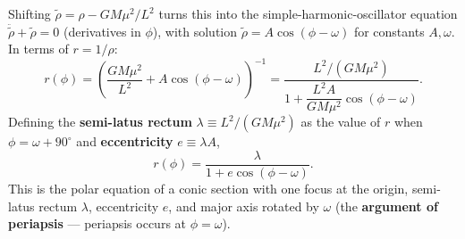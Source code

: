 \documentclass[11pt]{article}
\begin{document}
Shifting $\tilde\rho=\rho-GM\mu^2/L^2$ turns this into the simple-harmonic-oscillator equation $\ddot{\tilde\rho}+\tilde\rho=0$ (derivatives in $\phi$), with solution $\tilde\rho=A\cos(\phi-\omega)$ for constants $A,\omega$. In terms of $r=1/\rho$:
\[
r(\phi)=\left(\frac{GM\mu^2}{L^2}+A\cos(\phi-\omega)\right)^{-1}
=\frac{L^2/(GM\mu^2)}{1+\dfrac{L^2A}{GM\mu^2}\cos(\phi-\omega)}.
\]
Defining the \textbf{semi-latus rectum} $\lambda \equiv L^2/(GM\mu^2)$ as the value of $r$ when $\phi=\omega+90^{\circ}$ and \textbf{eccentricity} $e\equiv \lambda A$,
\begin{equation}
\boxed{r(\phi) = \frac{\lambda}{1+e\cos(\phi-\omega)}.} \label{eq:conic}
\end{equation}
This is the polar equation of a conic section with one focus at the origin, semi-latus rectum $\lambda$, eccentricity $e$, and major axis rotated by $\omega$ (the \textbf{argument of periapsis} — periapsis occurs at $\phi=\omega$). 
\end{document}
